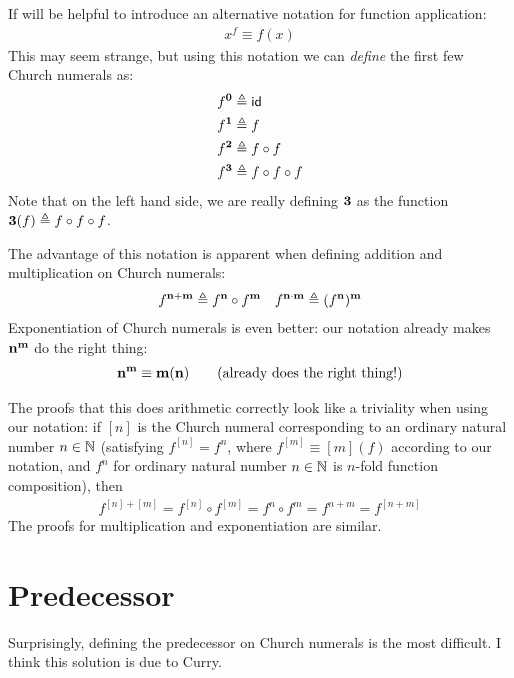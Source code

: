 If will be helpful to introduce an alternative notation for function application:
\begin{align*}
  x^f \equiv f(x)
\end{align*}
This may seem strange, but using this notation we can \emph{define} the first few Church numerals as:
\begin{align*}
  f^{\mathbf{0}} &\triangleq{} \mathsf{id}\\
  f^{\mathbf{1}} &\triangleq{} f \\
  f^{\mathbf{2}} &\triangleq{} f \circ f\\
  f^{\mathbf{3}} &\triangleq{} f \circ f \circ f
\end{align*}
Note that on the left hand side, we are really defining $\mathbf{3}$ as the function $\mathbf{3}(f) \triangleq{} f \circ f \circ f$.

The advantage of this notation is apparent when defining addition and multiplication on Church numerals:
\begin{align*}
  f^{\mathbf{n}+\mathbf{m}} \triangleq{} f^{\mathbf{n}} \circ f^{\mathbf{m}} &&
  f^{\mathbf{n}\cdot\mathbf{m}} \triangleq{} (f^{\mathbf{n}})^{\mathbf{m}}
\end{align*}
Exponentiation of Church numerals is even better: our notation already makes $\mathbf{n}^{\mathbf{m}}$ do the right thing:
\begin{align*}
  \mathbf{n}^{\mathbf{m}} \equiv \mathbf{m}(\mathbf{n}) \tag{already does the right thing!}
\end{align*}

The proofs that this does arithmetic correctly look like a triviality when using our notation: if $[n]$ is the Church numeral corresponding to an ordinary natural number $n \in \mathbb{N}$ (\ie satisfying $f^{[n]} = f^n$, where $f^{[m]} \equiv [m](f)$ according to our notation, and $f^n$ for ordinary natural number $n \in \mathbb{N}$ is $n$-fold function composition), then
\begin{align*}
  f^{[n]+[m]} = f^{[n]} \circ f^{[m]} = f^n \circ f^m = f^{n+m} = f^{[n+m]}
\end{align*}
The proofs for multiplication and exponentiation are similar.

\section{Predecessor}
Surprisingly, defining the predecessor on Church numerals is the most difficult. I think this solution is due to Curry.

